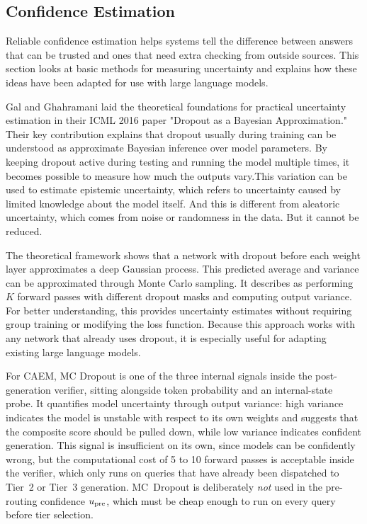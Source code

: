 \subsection{Confidence Estimation}

Reliable confidence estimation helps systems tell the difference between answers that can be trusted and ones that need extra checking from outside sources. This section looks at basic methods for measuring uncertainty and explains how these ideas have been adapted for use with large language models.

Gal and Ghahramani \cite{pmlr-v48-gal16} laid the theoretical foundations for practical uncertainty estimation in their ICML 2016 paper "Dropout as a Bayesian Approximation." Their key contribution explains that dropout usually during training can be understood as approximate Bayesian inference over model parameters. By keeping dropout active during testing and running the model multiple times, it becomes possible to measure how much the outputs vary.This variation can be used to estimate epistemic uncertainty, which refers to uncertainty caused by limited knowledge about the model itself. And this is different from aleatoric uncertainty, which comes from noise or randomness in the data. But it cannot be reduced.

The theoretical framework shows that a network with dropout before each weight layer approximates a deep Gaussian process. This predicted average and variance can be approximated through Monte Carlo sampling. It describes as performing $K$ forward passes with different dropout masks and computing output variance. For better understanding, this provides uncertainty estimates without requiring group training or modifying the loss function. Because this approach works with any network that already uses dropout, it is especially useful for adapting existing large language models.

For CAEM, MC Dropout is one of the three internal signals inside the post-generation verifier, sitting alongside token probability and an internal-state probe. It quantifies model uncertainty through output variance: high variance indicates the model is unstable with respect to its own weights and suggests that the composite score should be pulled down, while low variance indicates confident generation. This signal is insufficient on its own, since models can be confidently wrong, but the computational cost of 5 to 10 forward passes is acceptable inside the verifier, which only runs on queries that have already been dispatched to Tier~2 or Tier~3 generation. MC~Dropout is deliberately \textit{not} used in the pre-routing confidence $u_{\text{pre}}$, which must be cheap enough to run on every query before tier selection.


